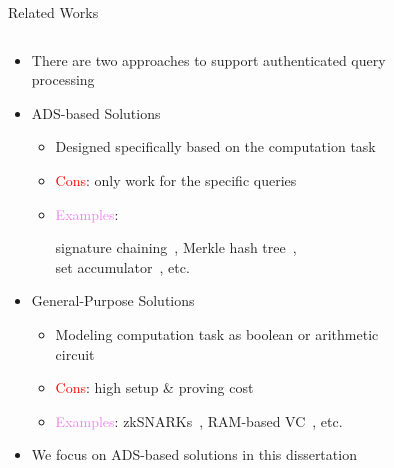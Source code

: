 \documentclass[xcolor={dvipsnames},aspectratio=169,10pt]{beamer}
\begin{document}
\begin{frame}{Related Works}
  \begin{columns}
    \begin{column}{0.8\linewidth}
      \begin{itemize}[<+->]
        \item There are two approaches to support authenticated query processing
        \item \alert{ADS-based Solutions}
          \begin{itemize}[<1->]
            \item Designed specifically based on the computation task
            \item {}
              \textcolor{Red}{Cons}: only work for the specific queries
            \item \textcolor{Violet}{Examples}:
              \parbox[t]{\linewidth}{%
                \strut%
                signature chaining~\cite{10.1109/ICDE.2004.1320027}, Merkle hash tree~\cite{10.1007/0-387-34805-0_21}, \\ set accumulator~\cite{10.1145/2660267.2660373}, etc.%
                \strut%
              }%
          \end{itemize}
        \item \alert{General-Purpose Solutions}
          \begin{itemize}[<1->]
            \item Modeling computation task as boolean or arithmetic circuit
            \item {}
              \textcolor{Red}{Cons}: high setup \& proving cost
            \item \textcolor{Violet}{Examples}: zkSNARKs~\cite{10.1109/sp.2013.47}, RAM-based VC~\cite{10.1145/2517349.2522733}, etc.
          \end{itemize}
        \item We focus on \alert{ADS-based solutions} in this dissertation
      \end{itemize}
    \end{column}%
    \begin{column}{0.2\linewidth}
      \begin{figure}
      \end{figure}%
    \end{column}
  \end{columns}
\end{frame}
\end{document}
